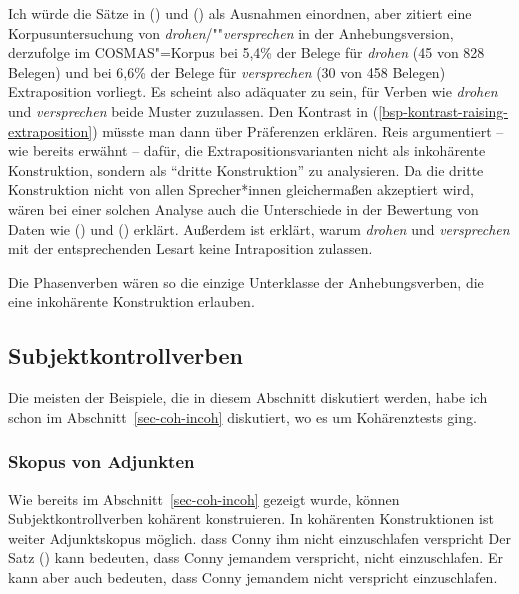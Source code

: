 \noindent
Ich würde die Sätze in () und () als Ausnahmen einordnen, aber \citet{Reis2005a} 
zitiert eine Korpusuntersuchung von \emph{drohen}/""\emph{versprechen} in der Anhebungsversion,
derzufolge im COSMAS"=Korpus bei 5,4\% der Belege für \emph{drohen} (45 von 828 Belegen)
und bei 6,6\% der Belege für \emph{versprechen} (30 von 458 Belegen) Extraposition vorliegt.
Es scheint also adäquater zu sein, für Verben wie \emph{drohen} und \emph{versprechen} 
beide Muster zuzulassen. Den Kontrast in (\ref{bsp-kontrast-raising-extraposition}) müsste man dann über Präferenzen erklären.
Reis argumentiert -- wie bereits erwähnt -- dafür, die Extrapositionsvarianten 
nicht als inkohärente Konstruktion, sondern als "`dritte Konstruktion"' zu analysieren. Da die
dritte Konstruktion nicht von allen Sprecher*innen gleichermaßen akzeptiert wird, wären bei
einer solchen Analyse auch die Unterschiede in der Bewertung von Daten wie () und ()
erklärt. Außerdem ist erklärt, warum \emph{drohen} und \emph{versprechen} mit der entsprechenden Lesart
keine Intraposition zulassen.%

Die Phasenverben wären so die einzige Unterklasse der Anhebungsverben,
die eine inkohärente Konstruktion erlauben.

\subsection{Subjektkontrollverben}

Die meisten der Beispiele, die in diesem Abschnitt diskutiert werden, habe
ich schon im Abschnitt~\ref{sec-coh-incoh} diskutiert, wo es um Kohärenztests ging.


\subsubsection{Skopus von Adjunkten}
\label{sec-subj-contr-scope}

Wie bereits im Abschnitt~\ref{sec-coh-incoh} gezeigt wurde, können Subjektkontrollverben
kohärent konstruieren.
In kohärenten Konstruktionen ist weiter Adjunktskopus möglich.
\ea{}
dass Conny ihm nicht einzuschlafen verspricht
\z
%
Der Satz () kann bedeuten, dass Conny jemandem verspricht, nicht einzuschlafen. Er kann aber
auch bedeuten, dass Conny jemandem nicht verspricht einzuschlafen.


